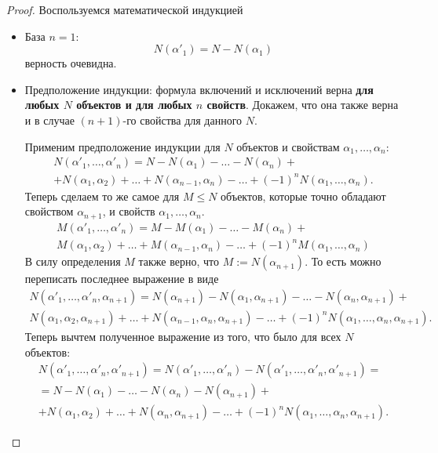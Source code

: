 \begin{proof}
	Воспользуемся математической индукцией
	\begin{itemize}
		\item База $n = 1$:
		\[
			N(\alpha'_1) = N - N(\alpha_1)
		\]
		верность очевидна.
		
		\item Предположение индукции: формула включений и исключений верна \textbf{для любых $N$ объектов и для любых $n$ свойств}. Докажем, что она также верна и в случае $(n + 1)$-го свойства для данного $N$.
		
		Применим предположение индукции для $N$ объектов и свойствам $\alpha_1, \ldots, \alpha_n$:
		\begin{multline*}
			N(\alpha'_1, \ldots, \alpha'_n) = N - N(\alpha_1) - \ldots - N(\alpha_n) + \\ +
			N(\alpha_1, \alpha_2) + \ldots + N(\alpha_{n - 1}, \alpha_n) - \ldots + (-1)^n N(\alpha_1, \ldots, \alpha_n).
		\end{multline*}
		Теперь сделаем то же самое для $M \le N$ объектов, которые точно обладают свойством $\alpha_{n + 1}$, и свойств $\alpha_1, \ldots, \alpha_n$.
		\begin{multline*}
			M(\alpha'_1, \ldots, \alpha'_n) = M - M(\alpha_1) - \ldots - M(\alpha_n) + \\
			M(\alpha_1, \alpha_2) + \ldots + M(\alpha_{n - 1}, \alpha_n) - \ldots + (-1)^n M(\alpha_1, \ldots, \alpha_n)
		\end{multline*}
		В силу определения $M$ также верно, что $M := N(\alpha_{n + 1})$. То есть можно переписать последнее выражение в виде
		\begin{multline*}
			N(\alpha'_1, \ldots, \alpha'_n, \alpha_{n + 1}) = N(\alpha_{n + 1}) - N(\alpha_1, \alpha_{n + 1}) - \ldots - N(\alpha_n, \alpha_{n + 1}) + \\
			N(\alpha_1, \alpha_2, \alpha_{n + 1}) + \ldots + N(\alpha_{n - 1}, \alpha_n, \alpha_{n + 1}) - \ldots + (-1)^n N(\alpha_1, \ldots, \alpha_n, \alpha_{n + 1}).
		\end{multline*}
		Теперь вычтем полученное выражение из того, что было для всех $N$ объектов:
		\begin{multline*}
			N(\alpha'_1, \ldots, \alpha'_n, \alpha'_{n + 1}) = N(\alpha'_1, \ldots, \alpha'_n) - N(\alpha'_1, \ldots, \alpha'_n, \alpha'_{n + 1}) = \\ =
			N - N(\alpha_1) - \ldots - N(\alpha_n) - N(\alpha_{n + 1}) + \\ +
			N(\alpha_1, \alpha_2) + \ldots + N(\alpha_n, \alpha_{n + 1}) - \ldots + (-1)^n N(\alpha_1, \ldots, \alpha_n, \alpha_{n + 1}).
		\end{multline*}
	\end{itemize}
\end{proof}

